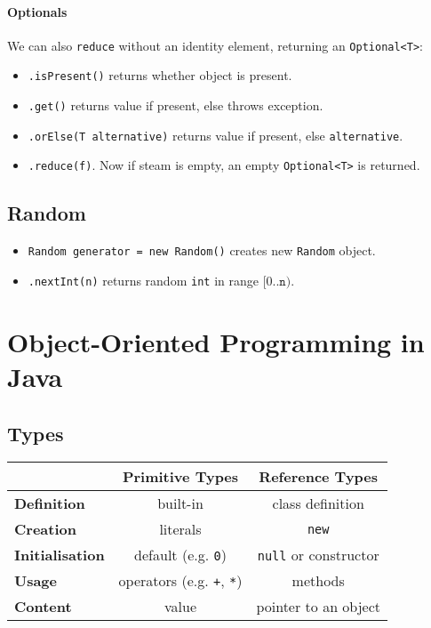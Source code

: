 \documentclass[twocolumn,english]{article}
\providecommand{\tabularnewline}{\\}
\begin{document}
\paragraph{Optionals}

We can also \texttt{reduce} without an identity element, returning
an \texttt{Optional\textless{}T\textgreater{}}:
\begin{itemize}
\item \texttt{.isPresent()} returns whether object is present.
\item \texttt{.get()} returns value if present, else throws exception.
\item \texttt{.orElse(T alternative)} returns value if present, else \texttt{alternative}.
\item \texttt{.reduce(f)}. Now if steam is empty, an empty \texttt{Optional\textless{}T\textgreater{}}
is returned.
\end{itemize}

\subsection{Random}
\begin{itemize}
\item \texttt{Random generator = new Random()} creates new \texttt{Random}
object.
\item \texttt{.nextInt(n)} returns random \texttt{int} in range $[0..\mathtt{n})$.
\end{itemize}

\section{Object-Oriented Programming in Java}


\subsection{Types}

\begin{table}[H]
\centering{}%
\begin{tabular}{lcc}
\toprule 
 & \textbf{Primitive Types} & \textbf{Reference Types}\tabularnewline
\midrule 
\textbf{Definition} & built-in & class definition\tabularnewline
\textbf{Creation} & literals & \texttt{new}\tabularnewline
\textbf{Initialisation} & default (e.g. \texttt{0}) & \texttt{null} or constructor\tabularnewline
\textbf{Usage} & operators (e.g. \texttt{+}, \texttt{{*}}) & methods\tabularnewline
\textbf{Content} & value & pointer to an object\tabularnewline
\bottomrule
\end{tabular}
\end{table}
\end{document}
